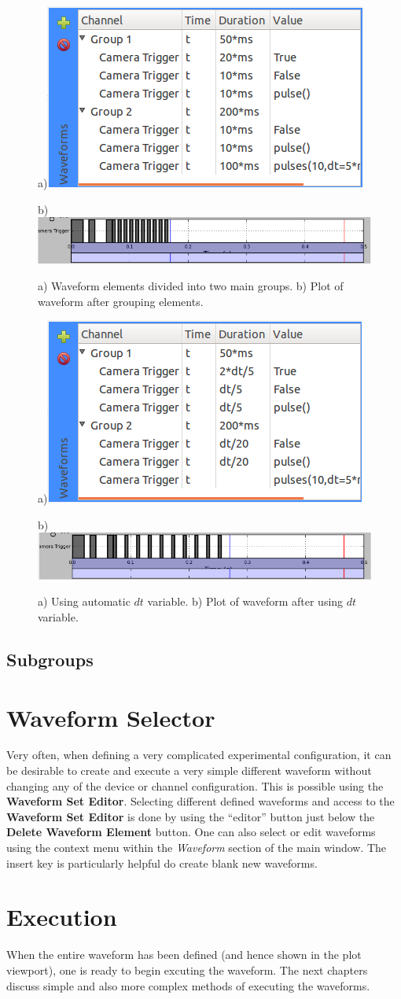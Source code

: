 \begin{figure}[ht]
  \centerline{a)\includegraphics[width=.5\textwidth]{figures/waveform-5}}
  \centerline{b)\includegraphics[width=.8\textwidth]{figures/plot-5}}
  \caption{a) Waveform elements divided into two main groups. b) Plot of
  waveform after grouping elements.}
  \label{fig:quick:waveform-5}
\end{figure}

\begin{figure}[ht]
  \centerline{a)\includegraphics[width=.5\textwidth]{figures/waveform-6}}
  \centerline{b)\includegraphics[width=.8\textwidth]{figures/plot-6}}
  \caption{a) Using automatic $dt$ variable. b) Plot of waveform after
  using $dt$ variable.}
  \label{fig:quick:waveform-6}
\end{figure}

\subsection{Subgroups}




\section{Waveform Selector}
Very often, when defining a very complicated experimental configuration, it can
be desirable to create and execute a very simple different waveform without
changing any of the device or channel configuration.  This is possible using the
\textbf{Waveform Set Editor}.  Selecting different defined waveforms and access
to the \textbf{Waveform Set Editor} is done by using the ``editor'' button just
below the \textbf{Delete Waveform Element} button.  One can also select or edit
waveforms using the context menu within the \textit{Waveform} section of the
main window.  The insert key is particularly helpful do create blank new waveforms.


\section{Execution}
When the entire waveform has been defined (and hence shown in the plot
viewport), one is ready to begin excuting the waveform.  The next chapters
discuss simple and also more complex methods of executing the waveforms.
